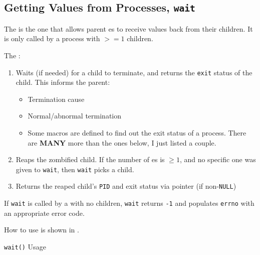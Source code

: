\subsection{Getting Values from Processes, \texttt{wait}}\label{subsec:Values_from_Processes-wait}
The   is the one that allows parent es to receive values back from their children.
It is only called by a process with $>= 1$ children.

The  :
\begin{enumerate}[noitemsep]
\item Waits (if needed) for a child to terminate, and returns the \texttt{exit} status of the child.
  This informs the parent:
  \begin{itemize}[noitemsep]
  \item Termination cause
  \item Normal/abnormal termination
  \item Some macros are defined to find out the exit status of a process.
    There are \textbf{MANY} more than the ones below, I just listed a couple.
  \end{itemize}

\item Reaps the zombified child.
  If the number of es is $\geq 1$, and no specific one was given to \texttt{wait}, then \texttt{wait} picks a child.
\item Returns the reaped child's \texttt{PID} and exit status via pointer (if non-\texttt{NULL})
\end{enumerate}

If \texttt{wait} is called by a  with no children, \texttt{wait} returns \texttt{-1} and populates \texttt{errno} with an appropriate error code.

How to use  is shown in .

\begin{listing}[h!tbp]
\caption{\texttt{wait()} Usage}
\label{lst:wait_Usage}
\end{listing}

